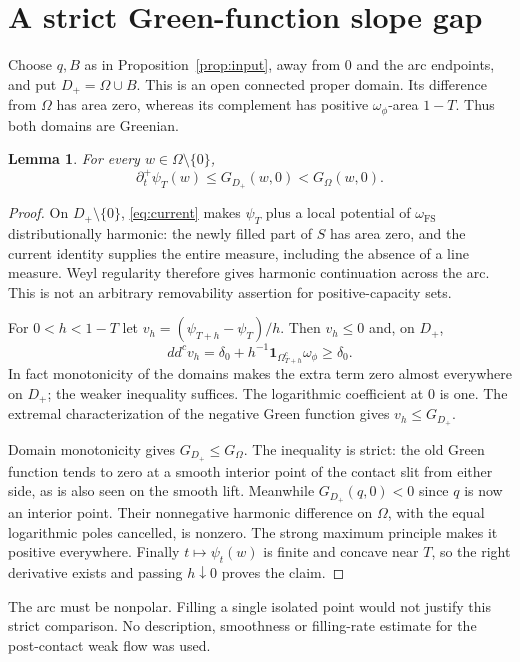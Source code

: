 \documentclass[11pt]{article}
\newtheorem{lemma}[theorem]{Lemma}
\newcommand{\ddc}{dd^c}
\newcommand{\FS}{\omega_{\mathrm{FS}}}
\newcommand{\ind}{\mathbf 1}
\begin{document}
\section{A strict Green-function slope gap}
Choose $q,B$ as in Proposition~\ref{prop:input}, away from $0$ and the arc
endpoints, and put $D_+=\Omega\cup B$. This is an open connected proper
domain. Its difference from $\Omega$ has area zero, whereas its complement
has positive $\omega_\phi$-area $1-T$. Thus both domains are Greenian.

\begin{lemma}\label{lem:gap}
For every $w\in\Omega\setminus\{0\}$,
\[
 \partial_t^+\psi_T(w)\leq G_{D_+}(w,0)<G_\Omega(w,0).
\]
\end{lemma}
\begin{proof}
On $D_+\setminus\{0\}$, \eqref{eq:current} makes $\psi_T$ plus a local
potential of $\FS$ distributionally harmonic: the newly filled part of $S$
has area zero, and the current identity supplies the entire measure, including
the absence of a line measure. Weyl regularity therefore gives harmonic
continuation across the arc. This is not an arbitrary removability assertion
for positive-capacity sets.

For $0<h<1-T$ let $v_h=(\psi_{T+h}-\psi_T)/h$. Then $v_h\leq0$ and,
on $D_+$,
\[
 \ddc v_h=\delta_0+h^{-1}\ind_{\Omega_{T+h}^c}\omega_\phi\geq\delta_0.
\]
In fact monotonicity of the domains makes the extra term zero almost
everywhere on $D_+$; the weaker inequality suffices. The logarithmic
coefficient at $0$ is one. The extremal characterization of the negative
Green function gives $v_h\leq G_{D_+}$.

Domain monotonicity gives $G_{D_+}\leq G_\Omega$. The inequality is strict:
the old Green function tends to zero at a smooth interior point of the
contact slit from either side, as is also seen on the smooth lift.
Meanwhile $G_{D_+}(q,0)<0$ since $q$ is now an interior point. Their
nonnegative harmonic difference on $\Omega$, with the equal logarithmic
poles cancelled, is nonzero. The strong maximum principle makes it positive
everywhere. Finally $t\mapsto\psi_t(w)$ is finite and concave near $T$, so
the right derivative exists and passing $h\downarrow0$ proves the claim.
\end{proof}

The arc must be nonpolar. Filling a single isolated point would not justify
this strict comparison. No description, smoothness or filling-rate estimate
for the post-contact weak flow was used.
\end{document}
